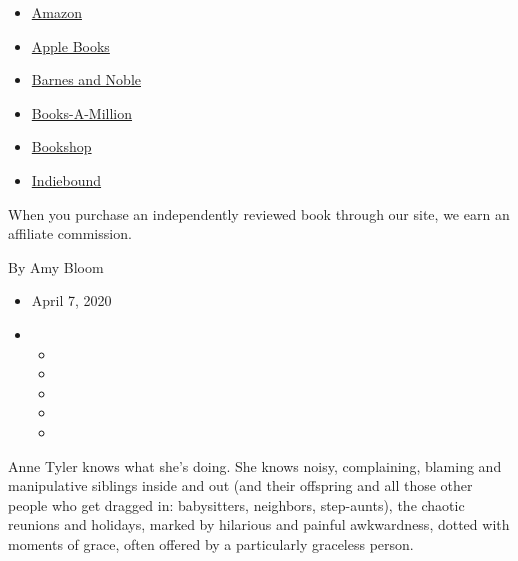 \begin{itemize}
\tightlist
\item
  \href{https://www.amazon.com/gp/search?index=books\&tag=NYTBSREV-20\&field-keywords=Redhead+by+the+Side+of+the+Road+Anne+Tyler}{Amazon}
\item
  \href{https://du-gae-books-dot-nyt-du-prd.appspot.com/buy?title=Redhead+by+the+Side+of+the+Road\&author=Anne+Tyler}{Apple
  Books}
\item
  \href{https://www.anrdoezrs.net/click-7990613-11819508?url=https\%3A\%2F\%2Fwww.barnesandnoble.com\%2Fs\%2FRedhead+by+the+Side+of+the+Road+Anne+Tyler}{Barnes
  and Noble}
\item
  \href{https://www.anrdoezrs.net/click-7990613-35140?url=https\%3A\%2F\%2Fwww.booksamillion.com\%2Fsearch\%3Fquery\%3DRedhead\%2Bby\%2Bthe\%2BSide\%2Bof\%2Bthe\%2BRoad\%2BAnne\%2BTyler}{Books-A-Million}
\item
  \href{https://bookshop.org/books?keywords=Redhead+by+the+Side+of+the+Road}{Bookshop}
\item
  \href{https://www.indiebound.org/search/book?searchfor=Redhead+by+the+Side+of+the+Road+Anne+Tyler\&aff=NYT}{Indiebound}
\end{itemize}

When you purchase an independently reviewed book through our site, we
earn an affiliate commission.

By Amy Bloom

\begin{itemize}
\item
  April 7, 2020
\item
  \begin{itemize}
  \item
  \item
  \item
  \item
  \item
  \end{itemize}
\end{itemize}

Anne Tyler knows what she's doing. She knows noisy, complaining, blaming
and manipulative siblings inside and out (and their offspring and all
those other people who get dragged in: babysitters, neighbors,
step-aunts), the chaotic reunions and holidays, marked by hilarious and
painful awkwardness, dotted with moments of grace, often offered by a
particularly graceless person.

